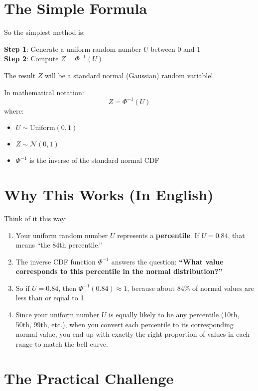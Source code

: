 \documentclass[12pt]{article}
\begin{document}
\section*{The Simple Formula}

So the simplest method is:

\textbf{Step 1}: Generate a uniform random number \textbf{$U$} between 0 and 1 \\
\textbf{Step 2}: Compute \textbf{$Z = \Phi^{-1}(U)$}

The result \textbf{$Z$} will be a standard normal (Gaussian) random variable!

In mathematical notation:
\[
Z = \Phi^{-1}(U)
\]
where:
\begin{itemize}
\item $U \sim \text{Uniform}(0,1)$
    \item $Z \sim \mathcal{N}(0,1)$
    \item $\Phi^{-1}$ is the inverse of the standard normal CDF
\end{itemize}

\section*{Why This Works (In English)}

Think of it this way:

\begin{enumerate}
    \item Your uniform random number \textbf{$U$} represents a \textbf{percentile}. If $U = 0.84$, that means ``the 84th percentile.''
    
    \item The inverse CDF function \textbf{$\Phi^{-1}$} answers the question: \textbf{``What value corresponds to this percentile in the normal distribution?''}
    
    \item So if $U = 0.84$, then $\Phi^{-1}(0.84) \approx 1$, because about 84\% of normal values are less than or equal to 1.
    
    \item Since your uniform number $U$ is equally likely to be any percentile (10th, 50th, 99th, etc.), when you convert each percentile to its corresponding normal value, you end up with exactly the right proportion of values in each range to match the bell curve.
\end{enumerate}

\section*{The Practical Challenge}
\end{document}
